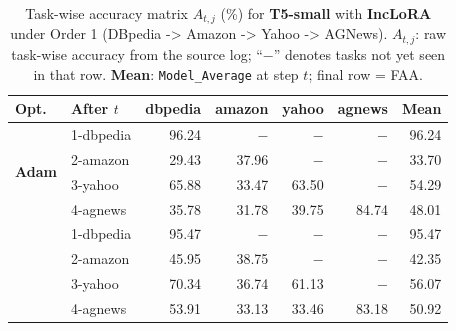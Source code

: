 \begin{table}[ht]
\centering
\caption{%
  Task-wise accuracy matrix $A_{t,j}$ (\%) for \textbf{T5-small} with \textbf{IncLoRA} under Order 1 (DBpedia -> Amazon -> Yahoo -> AGNews).
  $A_{t,j}$: raw task-wise accuracy from the source log; ``$-$'' denotes tasks not yet seen in that row.
  \textbf{Mean}: \texttt{Model\_Average} at step $t$; final row = FAA.
}
\label{tab:nlp_o1_t5small_inclora}
\setlength{\tabcolsep}{4.0pt}
\renewcommand{\arraystretch}{0.92}
\scriptsize
\begin{tabular}{@{}l l r r r r r@{}}
\toprule
\textbf{Opt.} & \textbf{After $t$} & \textbf{dbpedia} & \textbf{amazon} & \textbf{yahoo} & \textbf{agnews} & \textbf{Mean} \\
\midrule
\multirow{4}{*}{\textbf{Adam}} & 1-dbpedia & 96.24 & $-$ & $-$ & $-$ & 96.24 \\
 & 2-amazon & 29.43 & 37.96 & $-$ & $-$ & 33.70 \\
 & 3-yahoo & 65.88 & 33.47 & 63.50 & $-$ & 54.29 \\
 & 4-agnews & 35.78 & 31.78 & 39.75 & 84.74 & 48.01 \\
\addlinespace[2pt]
\multirow{4}{*}{\textbf{SAM}} & 1-dbpedia & 95.47 & $-$ & $-$ & $-$ & 95.47 \\
 & 2-amazon & 45.95 & 38.75 & $-$ & $-$ & 42.35 \\
 & 3-yahoo & 70.34 & 36.74 & 61.13 & $-$ & 56.07 \\
 & 4-agnews & 53.91 & 33.13 & 33.46 & 83.18 & 50.92 \\
\bottomrule
\end{tabular}
\end{table}

